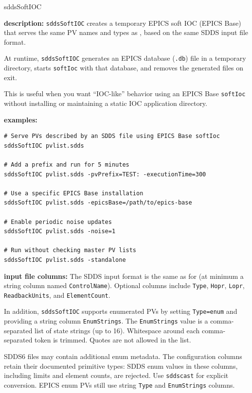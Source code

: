 %
%
\begin{sddsprog}{sddsSoftIOC}
\item \textbf{description:}
\verb+sddsSoftIOC+ creates a temporary EPICS soft IOC (EPICS Base) that serves the same PV names and types as
, based on the same SDDS input file format.

At runtime, \verb+sddsSoftIOC+ generates an EPICS database (\verb+.db+) file in a temporary directory, starts
\verb+softIoc+ with that database, and removes the generated files on exit.

This is useful when you want ``IOC-like'' behavior using an EPICS Base \verb+softIoc+ without installing or
maintaining a static IOC application directory.

\item \textbf{examples:}
\begin{verbatim}
# Serve PVs described by an SDDS file using EPICS Base softIoc
sddsSoftIOC pvlist.sdds

# Add a prefix and run for 5 minutes
sddsSoftIOC pvlist.sdds -pvPrefix=TEST: -executionTime=300

# Use a specific EPICS Base installation
sddsSoftIOC pvlist.sdds -epicsBase=/path/to/epics-base

# Enable periodic noise updates
sddsSoftIOC pvlist.sdds -noise=1

# Run without checking master PV lists
sddsSoftIOC pvlist.sdds -standalone
\end{verbatim}

\item \textbf{input file columns:}
The SDDS input format is the same as for  (at minimum a string column named \verb+ControlName+).
Optional columns include \verb+Type+, \verb+Hopr+, \verb+Lopr+, \verb+ReadbackUnits+, and \verb+ElementCount+.

In addition, \verb+sddsSoftIOC+ supports enumerated PVs by setting \verb+Type=enum+ and providing a string column
\verb+EnumStrings+. The \verb+EnumStrings+ value is a comma-separated list of state strings (up to 16).
Whitespace around each comma-separated token is trimmed. Quotes are not allowed in the list.

SDDS6 files may contain additional enum metadata. The configuration columns
retain their documented primitive types: SDDS enum values in these columns,
including limits and element counts, are rejected. Use \verb+sddscast+ for
explicit conversion. EPICS enum PVs still use string \verb+Type+ and
\verb+EnumStrings+ columns.


\end{sddsprog}
